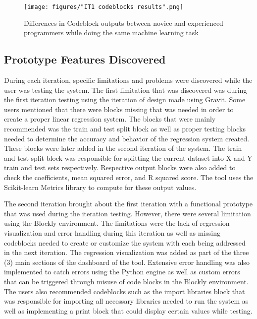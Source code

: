 \documentclass{sigchi}
\begin{document}
\begin{figure}[h]
    \centering
    \texttt{[image: figures/"IT1 codeblocks results".png]}
    \caption{Differences in Codeblock outputs between novice and experienced programmers while doing the same machine learning task}
    \label{fig:codeblockdifference}
\end{figure}


\subsection{Prototype Features Discovered}

During each iteration, specific limitations and problems were discovered while the user was testing the system. The first limitation that was discovered was during the first iteration testing using the iteration of design made using Gravit. Some users mentioned that there were blocks missing that was needed in order to create a proper linear regression system. The blocks that were mainly recommended was the train and test split block as well as proper testing blocks needed to determine the accuracy and behavior of the regression system created. These blocks were later added in the second iteration of the system. The train and test split block was responsible for splitting the current dataset into X and Y train and test sets respectively. Respective output blocks were also added to check the coefficients, mean squared error, and R squared score. The tool uses the Scikit-learn Metrics library to compute for these output values.

The second iteration brought about the first iteration with a functional prototype that was used during the iteration testing. However, there were several limitation using the Blockly environment. The limitations were the lack of regression visualization and error handling during this iteration as well as missing codeblocks needed to create or customize the system with each being addressed in the next iteration. The regression visualization was added as part of the three (3) main sections of the dashboard of the tool. Extensive error handling was also implemented to catch errors using the Python engine as well as custom errors that can be triggered through misuse of code blocks in the Blockly environment. The users also recommended codeblocks such as the import libraries block that was responsible for importing all necessary libraries needed to run the system as well as implementing a print block that could display certain values while testing. 
\end{document}
